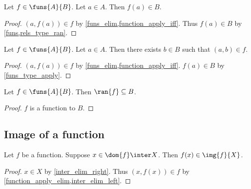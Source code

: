 \begin{proposition}\label{funs_type_apply}
    Let $f\in\funs{A}{B}$.
    Let $a\in A$.
    Then $f(a)\in B$.
\end{proposition}
\begin{proof}
    $(a,f(a)) \in f$ by \cref{funs_elim,function_apply_iff}.
    Thus $f(a)\in B$ by \cref{funs,rels_type_ran}.
\end{proof}

\begin{proposition}\label{funs_tuple_intro}
    Let $f\in\funs{A}{B}$.
    Let $a\in A$.
    Then there exists $b\in B$ such that $(a,b)\in f$.
\end{proposition}
\begin{proof}
    $(a,f(a)) \in f$ by \cref{funs_elim,function_apply_iff}.
    $f(a)\in B$ by \cref{funs_type_apply}.
\end{proof}


%
%

\begin{proposition}\label{funs_ran}
    Let $f\in\funs{A}{B}$.
    Then $\ran{f}\subseteq B$.
\end{proposition}
\begin{proof}
    $f$ is a function to $B$.
\end{proof}



\subsection{Image of a function}

\begin{proposition}\label{img_of_function_intro}
    Let $f$ be a function.
    Suppose $x\in\dom{f}\inter X$.
    Then $f(x)\in \img{f}{X}$.
\end{proposition}
\begin{proof}
    $x\in X$ by \cref{inter_elim_right}.
    Thus $(x,f(x))\in f$ by \cref{function_apply_elim,inter_elim_left}.
\end{proof}

